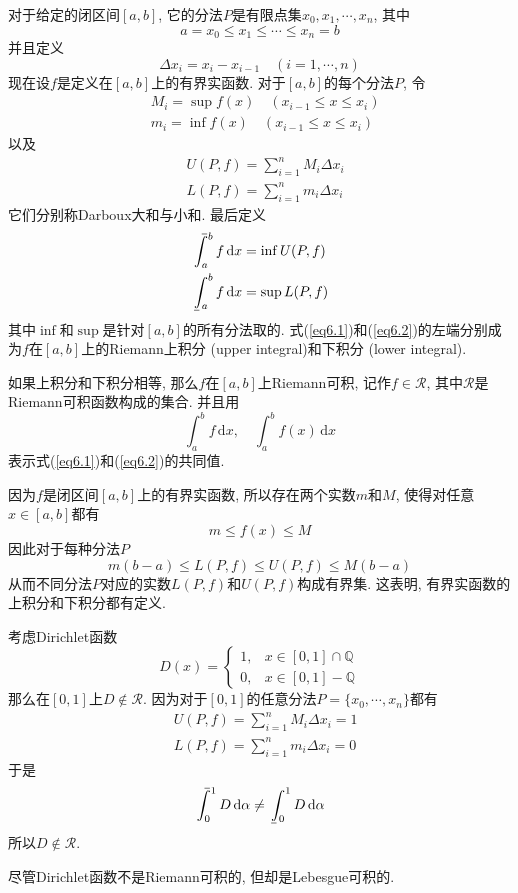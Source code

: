 \documentclass[cn,12pt,math=mtpro2,citestyle=gb7714-2015,bibstyle=gb7714-2015,twocol]{elegantbook}
\newcommand{\Q}{\mathbb{Q}}
\newcommand{\dx}{\,\text{d}x}
\newcommand{\da}{\,\text{d}\alpha}
\def\upint{\mathchoice%
    {\mkern13mu\overline{\vphantom{\intop}\mkern7mu}\mkern-20mu}%
    {\mkern7mu\overline{\vphantom{\intop}\mkern7mu}\mkern-14mu}%
    {\mkern7mu\overline{\vphantom{\intop}\mkern7mu}\mkern-14mu}%
    {\mkern7mu\overline{\vphantom{\intop}\mkern7mu}\mkern-14mu}%
  \int}
\def\lowint{\mkern3mu\underline{\vphantom{\intop}\mkern7mu}\mkern-10mu\int}
\begin{document}
对于给定的闭区间$[a,b]$, 它的分法$P$是有限点集$x_0,x_1,\cdots,x_n$, 其中
$$a=x_0\leq x_1\leq\cdots\leq x_n=b$$
并且定义
$$\Delta x_i=x_i-x_{i-1}\quad (i=1,\cdots,n)$$
现在设$f$是定义在$[a,b]$上的有界实函数. 对于$[a,b]$的每个分法$P$, 令
\begin{align*}
&M_i=\sup f(x)\quad (x_{i-1}\leq x\leq  x_i) \\
&m_i=\inf f(x) \quad(x_{i-1}\leq x\leq x_i)
\end{align*}
以及
\begin{align*}
&U(P,f)=\sum_{i=1}^{n}M_i\Delta x_i \\
&L(P,f)=\sum_{i=1}^{n}m_i\Delta x_i
\end{align*}
它们分别称Darboux大和与小和. 最后定义
\begin{align}
&\upint_{a}^{b} f\dx=\inf U(P,f) \label{eq6.1} \\
&\lowint_{a}^{b} f\dx=\sup L(P,f) \label{eq6.2}
\end{align}
其中$\inf$和$\sup$是针对$[a,b]$的所有分法取的. 式(\ref{eq6.1})和(\ref{eq6.2})的左端分别成为$f$在$[a,b]$上的Riemann上积分 (upper integral)和下积分 (lower integral).

\begin{definition}
如果上积分和下积分相等, 那么$f$在$[a,b]$上Riemann可积, 记作$f\in\mathscr{R}$, 其中$\mathscr{R}$是Riemann可积函数构成的集合. 并且用
$$\int_{a}^{b}f\dx,\quad \int_{a}^{b}f(x)\dx$$
表示式(\ref{eq6.1})和(\ref{eq6.2})的共同值.
\end{definition}
因为$f$是闭区间$[a,b]$上的有界实函数, 所以存在两个实数$m$和$M$, 使得对任意$x\in [a,b]$都有
$$m\leq f(x)\leq M$$
因此对于每种分法$P$
$$m(b-a)\leq L(P,f)\leq U(P,f)\leq M(b-a)$$
从而不同分法$P$对应的实数$L(P,f)$和$U(P,f)$构成有界集. 这表明, 有界实函数的上积分和下积分都有定义.
\begin{example}
考虑Dirichlet函数
$$D(x)=\begin{cases}
1, & x\in [0,1]\cap \Q \\
0, & x\in [0,1]-\Q \end{cases}$$
那么在$[0,1]$上$D\notin\mathscr{R}$. 因为对于$[0,1]$的任意分法$P=\{x_0,\cdots,x_n\}$都有
\begin{align*}
&U(P,f)=\sum_{i=1}^{n}M_i\Delta  x_i=1 \\
&L(P,f)=\sum_{i=1}^{n}m_i\Delta x_i=0
\end{align*}
于是
$$\upint_0^1D\da\neq\lowint_0^1D\da$$
所以$D\notin\mathscr{R}$.
\end{example}
\begin{remark}
尽管Dirichlet函数不是Riemann可积的, 但却是Lebesgue可积的.
\end{remark}
\end{document}
